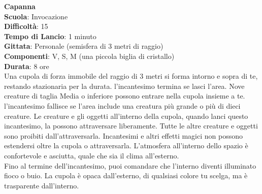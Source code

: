 \begin{multicols}{2}
\medskip\textbf{Capanna}\\
\textbf{Scuola}: Invocazione\\
\textbf{Difficoltà}:  15\\
\textbf{Tempo di Lancio}: 1 minuto\\
\textbf{Gittata}: Personale (semisfera di 3 metri di raggio)\\
\textbf{Componenti}: V, S, M (una piccola biglia di cristallo)\\
\textbf{Durata}: 8 ore\\
Una cupola di forza immobile del raggio di 3 metri si forma intorno e sopra di te, restando stazionaria per la durata. l'incantesimo termina se lasci l’area. Nove creature di taglia Media o inferiore possono entrare nella cupola insieme a te. l'incantesimo fallisce se l’area include una creatura più grande o più di dieci creature. Le creature e gli oggetti all'interno della cupola, quando lanci questo incantesimo, la possono attraversare liberamente. Tutte le altre creature e oggetti sono proibiti dall'attraversarla. Incantesimi e altri effetti magici non possono estendersi oltre la cupola o attraversarla. L’atmosfera all'interno dello spazio è confortevole e asciutta, quale che sia il clima all'esterno.\\
Fino al termine dell'incantesimo, puoi comandare che l’interno diventi illuminato fioco o buio. La cupola è opaca dall'esterno, di qualsiasi colore tu scelga, ma è trasparente dall'interno. 


\end{multicols}
